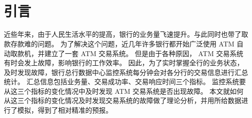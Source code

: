 \documentclass[a4paper]{article}
\begin{document}
\begin{titlepage}



\end{titlepage}

\begin{Huge}
\end{Huge}
\begin{large}
	\begin{flushright}
		
	\end{flushright}
\end{large}
\ \ \\\\

\begin{abstract}
\textit{}
\end{abstract}

\newpage

\tableofcontents

\newpage

\part{引言}
近些年来，由于人民生活水平的提高，银行的业务量飞速提升。与此同时也带了取款存款难的问题。
为了解决这个问题，近几年许多银行都开始广泛使用 ATM 自动取款机，并建立了一套 ATM 交易系统。
但是由于各种原因， ATM 交易系统有时会发上故障，影响银行的工作效率。
因此，为了实时掌握全行的业务状态，及时发现故障，银行总行数据中心监控系统每分钟会对各分行的交易信息进行汇总统计。
汇总信息包括业务量、交易成功率、交易响应时间三个指标。
监控系统要从这三个指标的变化情况中及时发现 ATM 交易系统是否出现故障。
本文就如何从这三个指标的变化情况及时发现交易系统的故障做了理论分析，并用所给数据进行了模拟，得到了相对精准的预报。
\end{document}
